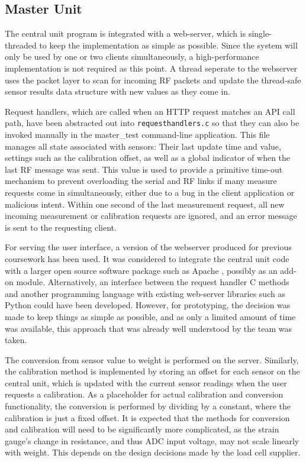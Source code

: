 \subsection{Master Unit}
The central unit program is integrated with a web-server, which is single-threaded to keep the implementation as simple as possible. Since the system will only be used by one or two clients simultaneously, a high-performance implementation is not required as this point. A thread seperate to the webserver uses the packet layer to scan for incoming RF packets and update the thread-safe sensor results data structure with new values as they come in.

Request handlers, which are called when an HTTP request matches an API call path, have been abstracted out into \texttt{requesthandlers.c} so that they can also be invoked manually in the master\_test command-line application. This file manages all state associated with sensors: Their last update time and value, settings such as the calibration offset, as well as a global indicator of when the last RF message was sent. This value is used to provide a primitive time-out mechanism to prevent overloading the serial and RF links if many measure requests come in simultaneously, either due to a bug in the client application or malicious intent. Within one second of the last measurement request, all new incoming measurement or calibration requests are ignored, and an error message is sent to the requesting client.

For serving the user interface, a version of the webserver produced for previous coursework\cite{ns3-coursework} has been used. It was considered to integrate the central unit code with a larger open source software package such as Apache \cite{apache}, possibly as an add-on module. Alternatively, an interface between the request handler C methods and another programming language with existing web-server libraries such as Python could have been developed. However, for prototyping, the decision was made to keep things as simple as possible, and as only a limited amount of time was available, this approach that was already well understood by the team was taken.

The conversion from sensor value to weight is performed on the server. Similarly, the calibration method is implemented by storing an offset for each sensor on the central unit, which is updated with the current sensor readings when the user requests a calibration. As a placeholder for actual calibration and conversion functionality, the conversion is performed by dividing by a constant, where the calibration is just a fixed offset. It is expected that the methods for conversion and calibration will need to be significantly more complicated, as the strain gauge's change in resistance, and thus ADC input voltage, may not scale linearly with weight. This depends on the design decisions made by the load cell supplier.

